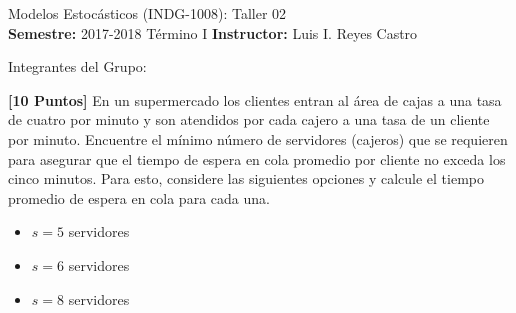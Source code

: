 \documentclass[ a4paper, twoside, 11pt]{article}
\newcommand{\numero}{02}
\begin{document}
\allowdisplaybreaks

\begin{center}
\Large Modelos Estoc\'asticos (INDG-1008): Taller \numero \\[1ex]
\small \textbf{Semestre:} 2017-2018 T\'ermino I \qquad
\textbf{Instructor:} Luis I. Reyes Castro
\end{center}
\halfskip

Integrantes del Grupo:
\fullskip
\fullskip

\begin{problem}
\textbf{[10 Puntos]} En un supermercado los clientes entran al \'area de cajas a una tasa de cuatro por minuto y son atendidos por cada cajero a una tasa de un cliente por minuto. Encuentre el m\'inimo n\'umero de servidores (\ie cajeros) que se requieren para asegurar que el tiempo de espera en cola promedio por cliente no exceda los cinco minutos. Para esto, considere las siguientes opciones y calcule el tiempo promedio de espera en cola para cada una. 
\begin{itemize}
\item $s = 5$ servidores
\item $s = 6$ servidores
\item $s = 8$ servidores
\end{itemize}


\end{problem}
\end{document}
